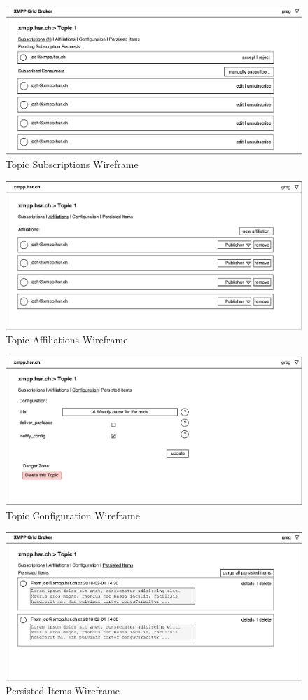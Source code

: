 \begin{figure}[h]
    \centering
    \includegraphics[width=1\linewidth]{resources/wireframe_4}
    \caption{Topic Subscriptions Wireframe}
\end{figure}

\begin{figure}[h]
    \centering
    \includegraphics[width=1\linewidth]{resources/wireframe_5}
    \caption{Topic Affiliations Wireframe}
\end{figure}

\begin{figure}[h]
    \centering
    \includegraphics[width=1\linewidth]{resources/wireframe_6}
    \caption{Topic Configuration Wireframe}
\end{figure}

\begin{figure}[h]
    \centering
    \includegraphics[width=1\linewidth]{resources/wireframe_7}
    \caption{Persisted Items Wireframe}
\end{figure}